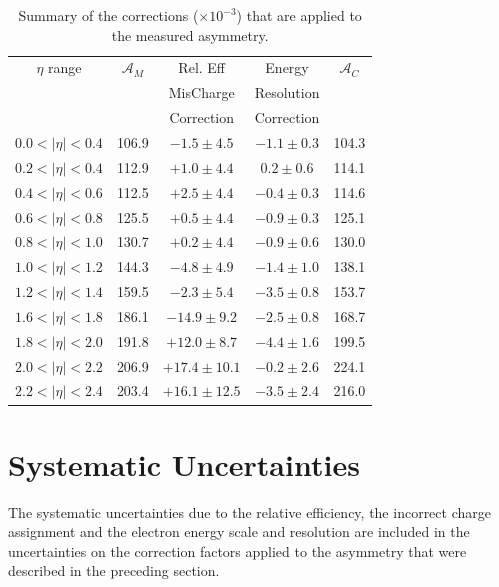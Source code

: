 \begin{table}[htbp]
  \begin{center}
    \begin{tabular}{ccccc}
\toprule
$\eta$ range & $\mathcal{A}_M$ & Rel. Eff & Energy & $\mathcal{A}_C$ \\
& & MisCharge & Resolution &  \\
& & Correction  & Correction & \\
\midrule
 $0.0<|\eta|<0.4$ & 106.9 &$- 1.5\pm 4.5$ & $-1.1\pm0.3$ & 104.3\\ 
 $0.2<|\eta|<0.4$ & 112.9 &$+ 1.0\pm 4.4$ & $ 0.2\pm0.6$ & 114.1\\ 
 $0.4<|\eta|<0.6$ & 112.5 &$+ 2.5\pm 4.4$ & $-0.4\pm0.3$ & 114.6\\
 $0.6<|\eta|<0.8$ & 125.5 &$+ 0.5\pm 4.4$ & $-0.9\pm0.3$ & 125.1\\ 
 $0.8<|\eta|<1.0$ & 130.7 &$+ 0.2\pm 4.4$ & $-0.9\pm0.6$ & 130.0\\ 
 $1.0<|\eta|<1.2$ & 144.3 &$- 4.8\pm 4.9$ & $-1.4\pm1.0$ & 138.1\\ 
 $1.2<|\eta|<1.4$ & 159.5 &$- 2.3\pm 5.4$ & $-3.5\pm0.8$ & 153.7\\ 
 $1.6<|\eta|<1.8$ & 186.1 &$-14.9\pm 9.2$ & $-2.5\pm0.8$ & 168.7\\
 $1.8<|\eta|<2.0$ & 191.8 &$+12.0\pm 8.7$ & $-4.4\pm1.6$ & 199.5\\
 $2.0<|\eta|<2.2$ & 206.9 &$+17.4\pm10.1$ & $-0.2\pm2.6$ & 224.1\\
 $2.2<|\eta|<2.4$ & 203.4 &$+16.1\pm12.5$ & $-3.5\pm2.4$ & 216.0\\
\bottomrule
    \end{tabular}
    \caption[Summary of the corrections that are applied to the measured
asymmetry.]{\label{tab:correctionfactors}Summary of the corrections ($\times
10^{-3}$) that are applied to the measured asymmetry\cite{bendavid2011electron}.}
  \end{center}
\end{table}


\section{Systematic Uncertainties}
The systematic uncertainties due to the relative efficiency, the incorrect
charge assignment and the electron energy scale and resolution are included in
the uncertainties on the correction factors applied to the asymmetry that were
described in the preceding section.

